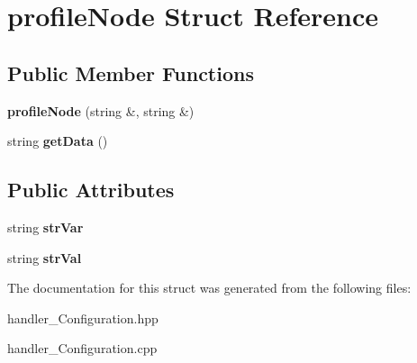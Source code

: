 \hypertarget{structprofileNode}{
\section{profileNode Struct Reference}
\label{structprofileNode}
}
\subsection*{Public Member Functions}
\begin{DoxyCompactItemize}
\item 
\hypertarget{structprofileNode_abef77862590c3f7309ea79c170f77293}{
{\bfseries profileNode} (string \&, string \&)}
\label{structprofileNode_abef77862590c3f7309ea79c170f77293}

\item 
\hypertarget{structprofileNode_aa2d5252dd9a7e41c78a43ebdf6cc3301}{
string {\bfseries getData} ()}
\label{structprofileNode_aa2d5252dd9a7e41c78a43ebdf6cc3301}

\end{DoxyCompactItemize}
\subsection*{Public Attributes}
\begin{DoxyCompactItemize}
\item 
\hypertarget{structprofileNode_a6b91777554bee2d799c90ea4f650490c}{
string {\bfseries strVar}}
\label{structprofileNode_a6b91777554bee2d799c90ea4f650490c}

\item 
\hypertarget{structprofileNode_a138f86b8e22541f1bf6a12dd361ac1bb}{
string {\bfseries strVal}}
\label{structprofileNode_a138f86b8e22541f1bf6a12dd361ac1bb}

\end{DoxyCompactItemize}


The documentation for this struct was generated from the following files:\begin{DoxyCompactItemize}
\item 
handler\_\-Configuration.hpp\item 
handler\_\-Configuration.cpp\end{DoxyCompactItemize}
